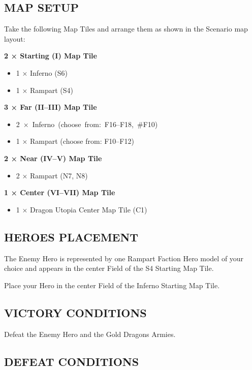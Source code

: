\begin{multicols*}{2}
\subsection*{\MakeUppercase{Map Setup}}

Take the following Map Tiles and arrange them as shown in the Scenario map layout:

\textbf{2 × Starting (I) Map Tile}
\begin{itemize}
  \item 1 × Inferno (S6)
  \item 1 × Rampart (S4)
\end{itemize}

\textbf{3 × Far (II--III) Map Tile}
\begin{itemize}
  \item \mbox{2 × Inferno (choose from: F16--F18, \#F10)}
  \item 1 × Rampart (choose from: F10--F12)
\end{itemize}

\textbf{2 × Near (IV--V) Map Tile}
\begin{itemize}
  \item 2 × Rampart (N7, N8)
\end{itemize}

\textbf{1 × Center (VI--VII) Map Tile}
\begin{itemize}
  \item 1 × Dragon Utopia Center Map Tile (C1)
\end{itemize}

\subsection*{\MakeUppercase{Heroes Placement}}

The Enemy Hero is represented by one Rampart Faction Hero model of your choice
and appears in the center Field of the S4 Starting Map Tile.

Place your Hero in the center Field of the Inferno Starting Map Tile.

\subsection*{\MakeUppercase{Victory Conditions}}

Defeat the Enemy Hero and the Gold Dragons Armies.

\subsection*{\MakeUppercase{Defeat Conditions}}


\end{multicols*}
